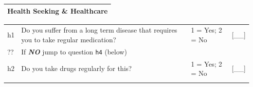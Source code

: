 \documentclass[12pt,a4paper]{book}
\theoremstyle{definition}
\theoremstyle{definition}
\theoremstyle{definition}
\theoremstyle{remark}
\begin{document}
\begin{longtable}[]{@{}c@{}}
\toprule
\begin{minipage}[t]{0.97\columnwidth}\centering
\textbf{Health Seeking \& Healthcare}\strut
\end{minipage}\tabularnewline
\bottomrule
\end{longtable}

\begin{longtable}[]{@{}llll@{}}
\toprule
\begin{minipage}[t]{0.09\columnwidth}\raggedright
h1\strut
\end{minipage} & \begin{minipage}[t]{0.41\columnwidth}\raggedright
Do you suffer from a long term disease that requires you to take regular
medication?\strut
\end{minipage} & \begin{minipage}[t]{0.25\columnwidth}\raggedright
1 = Yes; 2 = No\strut
\end{minipage} & \begin{minipage}[t]{0.13\columnwidth}\raggedright
{[}\_\_{]}\strut
\end{minipage}\tabularnewline
\begin{minipage}[t]{0.09\columnwidth}\raggedright
??\strut
\end{minipage} & \begin{minipage}[t]{0.41\columnwidth}\raggedright
If \textbf{\emph{NO}} jump to question \texttt{h4} (below)\strut
\end{minipage} & \begin{minipage}[t]{0.25\columnwidth}\raggedright
\strut
\end{minipage} & \begin{minipage}[t]{0.13\columnwidth}\raggedright
\strut
\end{minipage}\tabularnewline
\begin{minipage}[t]{0.09\columnwidth}\raggedright
h2\strut
\end{minipage} & \begin{minipage}[t]{0.41\columnwidth}\raggedright
Do you take drugs regularly for this?\strut
\end{minipage} & \begin{minipage}[t]{0.25\columnwidth}\raggedright
1 = Yes; 2 = No\strut
\end{minipage} & \begin{minipage}[t]{0.13\columnwidth}\raggedright
{[}\_\_{]}\strut
\end{minipage}\tabularnewline
\begin{minipage}[t]{0.09\columnwidth}\raggedright

\end{minipage}
\end{longtable}
\end{document}

